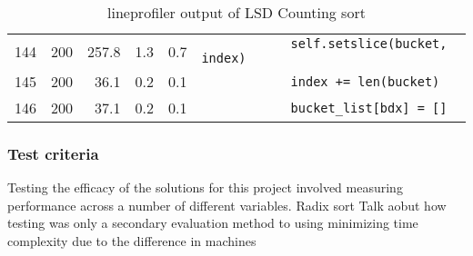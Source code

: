 \documentclass[12pt]{article}
\begin{document}
\begin{table}[H]
{{\begin{tabular}{rrrrrl}
	 144 & 200   & 257.8  & 1.3    & 0.7  &  \;\;\;\;\;\;\;\;\;\;\;\;\lstinline{            self.setslice(bucket, index)}\\
	 145 & 200   & 36.1   & 0.2    & 0.1  &  \;\;\;\;\;\;\;\;\;\;\;\;\lstinline{            index += len(bucket)}\\
	 146 & 200   & 37.1   & 0.2    & 0.1  &  \;\;\;\;\;\;\;\;\;\;\;\;\lstinline{            bucket_list[bdx] = []}\\
	 \hline
		\end{tabular}
		}}
		\caption*{line\textunderscore profiler output of LSD Counting sort}
	\end{table}


\subsubsection{Test criteria}
Testing the efficacy of the solutions for this project involved measuring performance across a number of different variables. Radix sort 
{\color{red} Talk aobut how testing was only a secondary evaluation method to using minimizing time complexity due to the difference in machines}
\pagebreak
\printbibliography
\end{document}

